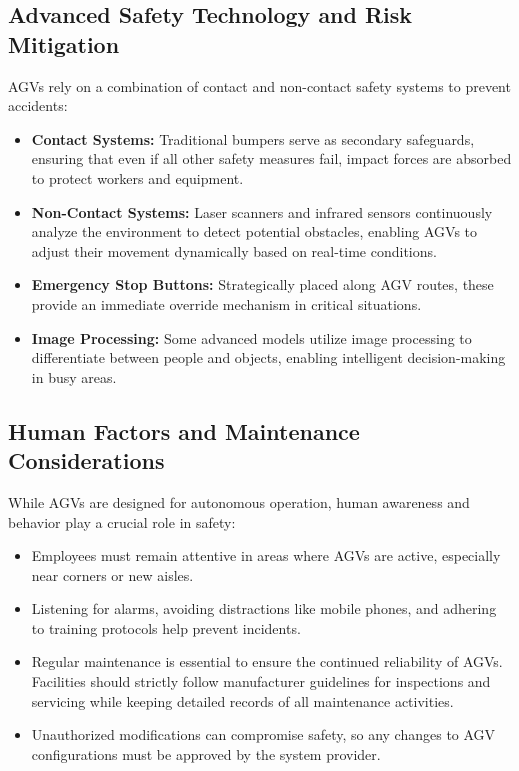 \documentclass[../../main]{subfiles}
\begin{document}
\subsection{Advanced Safety Technology and Risk Mitigation}
AGVs rely on a combination of contact and non-contact safety 
systems to prevent accidents:
\begin{itemize}
    \item \textbf{Contact Systems:} Traditional bumpers serve as 
          secondary safeguards, ensuring that even if all other 
          safety measures fail, impact forces are absorbed to 
          protect workers and equipment.
    \item \textbf{Non-Contact Systems:} Laser scanners and infrared 
          sensors continuously analyze the environment to detect 
          potential obstacles, enabling AGVs to adjust their movement 
          dynamically based on real-time conditions.
    \item \textbf{Emergency Stop Buttons:} Strategically placed along 
          AGV routes, these provide an immediate override mechanism 
          in critical situations.
    \item \textbf{Image Processing:} Some advanced models utilize image 
          processing to differentiate between people and objects, 
          enabling intelligent decision-making in busy areas.
\end{itemize}

\subsection{Human Factors and Maintenance Considerations}
While AGVs are designed for autonomous operation, human awareness 
and behavior play a crucial role in safety:
\begin{itemize}
    \item Employees must remain attentive in areas where AGVs are 
          active, especially near corners or new aisles.
    \item Listening for alarms, avoiding distractions like mobile 
          phones, and adhering to training protocols help prevent 
          incidents.
    \item Regular maintenance is essential to ensure the continued 
          reliability of AGVs. Facilities should strictly follow 
          manufacturer guidelines for inspections and servicing 
          while keeping detailed records of all maintenance activities.
    \item Unauthorized modifications can compromise safety, so any 
          changes to AGV configurations must be approved by the 
          system provider.
\end{itemize}
\end{document}
